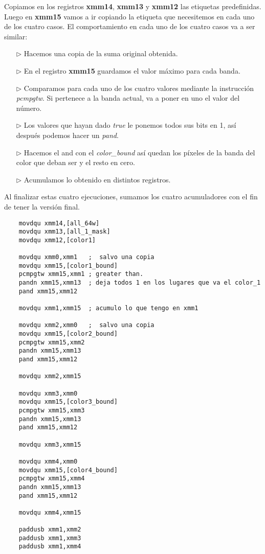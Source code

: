 \documentclass[a4paper]{article}
\begin{document}
\indent Copiamos en los registros \textbf{xmm14}, \textbf{xmm13} y \textbf{xmm12} las etiquetas predefinidas. Luego en \textbf{xmm15} vamos a ir copiando la etiqueta que necesitemos en cada uno de los cuatro casos. El comportamiento en cada uno de los cuatro casos va a ser similar:
\begin{itemize}
\item[$\triangleright$] Hacemos una copia de la suma original obtenida.
\item[$\triangleright$] En el registro \textbf{xmm15} guardamos el valor m\'aximo para cada banda.
\item[$\triangleright$] Comparamos para cada uno de los cuatro valores mediante la instrucci\'on \textit{pcmpgtw}. Si pertenece a la banda actual, va a poner en uno el valor del n\'umero.
\item[$\triangleright$] Los valores que hayan dado \emph{true} le ponemos todos sus bits en 1, as\'i despu\'es podemos hacer un \textit{pand}.
\item[$\triangleright$] Hacemos el and con el \emph{color_bound} as\'i quedan los p\'ixeles de la banda del color que deban ser y el resto en cero.
\item[$\triangleright$] Acumulamos lo obtenido en distintos registros.
\end{itemize}
Al finalizar estas cuatro ejecuciones, sumamos los cuatro acumuladores con el fin de tener la versi\'on final.

\begin{codesnippet}
\begin{verbatim}
    movdqu xmm14,[all_64w]
    movdqu xmm13,[all_1_mask]
    movdqu xmm12,[color1]

    movdqu xmm0,xmm1   ;  salvo una copia
    movdqu xmm15,[color1_bound] 
    pcmpgtw xmm15,xmm1 ; greater than.
    pandn xmm15,xmm13  ; deja todos 1 en los lugares que va el color_1
    pand xmm15,xmm12

    movdqu xmm1,xmm15  ; acumulo lo que tengo en xmm1

    movdqu xmm2,xmm0   ;  salvo una copia
    movdqu xmm15,[color2_bound]
    pcmpgtw xmm15,xmm2
    pandn xmm15,xmm13
    pand xmm15,xmm12

    movdqu xmm2,xmm15  

    movdqu xmm3,xmm0
    movdqu xmm15,[color3_bound]
    pcmpgtw xmm15,xmm3
    pandn xmm15,xmm13
    pand xmm15,xmm12

    movdqu xmm3,xmm15

    movdqu xmm4,xmm0
    movdqu xmm15,[color4_bound]
    pcmpgtw xmm15,xmm4
    pandn xmm15,xmm13
    pand xmm15,xmm12

    movdqu xmm4,xmm15

    paddusb xmm1,xmm2
    paddusb xmm1,xmm3
    paddusb xmm1,xmm4
\end{verbatim}
\end{codesnippet}
\end{document}

